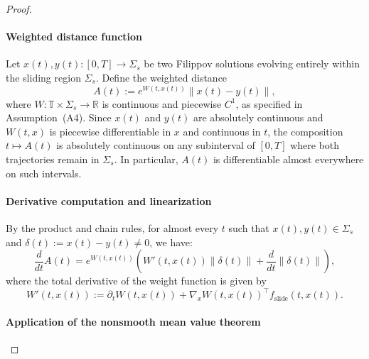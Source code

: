 \documentclass[11pt]{article}
\begin{document}
\begin{proof}
\paragraph{Weighted distance function}

Let \( x(t), y(t) : [0,T] \to \Sigma_s \) be two Filippov solutions evolving entirely within the sliding region \( \Sigma_s \). Define the weighted distance
\begin{equation} \label{eq:sliding_weighted_distance}
	A(t) := e^{W(t,x(t))} \|x(t) - y(t)\|,
\end{equation}
where \( W : \mathbb{T} \times \Sigma_s \to \mathbb{R} \) is continuous and piecewise \( C^1 \), as specified in Assumption~(A4). Since \( x(t) \) and \( y(t) \) are absolutely continuous and \( W(t,x) \) is piecewise differentiable in \( x \) and continuous in \( t \), the composition \( t \mapsto A(t) \) is absolutely continuous on any subinterval of \( [0,T] \) where both trajectories remain in \( \Sigma_s \). In particular, \( A(t) \) is differentiable almost everywhere on such intervals.



\paragraph{Derivative computation and linearization}

By the product and chain rules, for almost every \( t \) such that \( x(t), y(t) \in \Sigma_s \) and \( \delta(t) := x(t) - y(t) \neq 0 \), we have:
\begin{equation} \label{eq:A_derivative_sliding}
	\frac{d}{dt} A(t) = e^{W(t,x(t))} \left( W'(t,x(t)) \| \delta(t) \| + \frac{d}{dt} \| \delta(t) \| \right),
\end{equation}
where the total derivative of the weight function is given by
\begin{equation} \label{eq:W_prime_sliding}
	W'(t,x(t)) := \partial_t W(t,x(t)) + \nabla_x W(t,x(t))^\top f_{\mathrm{slide}}(t,x(t)).
\end{equation}



\paragraph{Application of the nonsmooth mean value theorem}


\end{proof}
\end{document}
